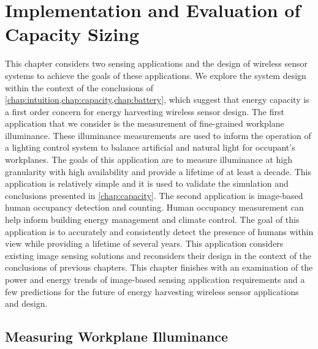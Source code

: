 \chapter{Implementation and Evaluation of Capacity Sizing}
\label{chap:permacam}

This chapter considers two sensing applications and the design of wireless sensor systems to achieve the goals of these applications.
We explore the system design within the context of the conclusions of \cref{chap:intuition,chap:capacity,chap:battery}, which suggest that energy capacity is a first order concern for energy harvesting wireless sensor design.
The first application that we consider is the measurement of fine-grained workplane illuminance. These illuminance measurements are used to inform the operation of a lighting control system to balance artificial and natural light for occupant's workplanes. 
The goals of this application are to measure illuminance at high granularity with high availability and provide a lifetime of at least a decade. 
This application is relatively simple and it is used to validate the simulation and conclusions presented in \cref{chap:capacity}.
The second application is image-based human occupancy detection and counting. 
Human occupancy measurement can help inform building energy management and climate control.
The goal of this application is to accurately and consistently detect the presence of humans within view while providing a lifetime of several years.
This application considers existing image sensing solutions and reconsiders their design in the context of the conclusions of previous chapters.
This chapter finishes with an examination of the power and energy trends of image-based sensing application requirements and a few predictions for the future of energy harvesting wireless sensor applications and design. 

\section{Measuring Workplane Illuminance}
\label{sec:impl:permamote}



